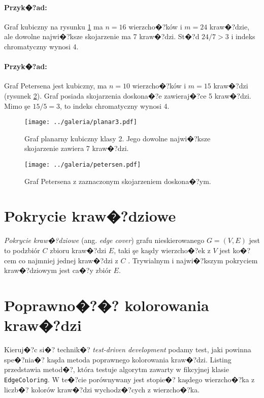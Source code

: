 \documentclass[12pt,a4paper]{mwrep}
\begin{document}
\paragraph{Przyk�?ad:} Graf kubiczny na rysunku \ref{fig:planar3}
ma $n=16$ wierzcho�?ków i $m=24$ kraw�?dzie, 
ale dowolne najwi�?ksze skojarzenie ma 7 kraw�?dzi. 
St�?d $24/7 > 3$ i indeks chromatyczny wynosi 4.

\paragraph{Przyk�?ad:} Graf Petersena jest kubiczny, ma
$n=10$ wierzcho�?ków i $m=15$ kraw�?dzi (rysunek \ref{fig:petersen}).
Graf posiada skojarzenia doskona�?e zawieraj�?ce 5 kraw�?dzi.
Mimo şe $15/5=3$, to indeks chromatyczny wynosi 4.

\begin{figure}[h]
\centering
\texttt{[image: ../galeria/planar3.pdf]}
\caption[Graf planarny kubiczny klasy 2.]{
\label{fig:planar3}
Graf planarny kubiczny klasy 2.
Jego dowolne najwi�?ksze skojarzenie zawiera 7 kraw�?dzi.}
\end{figure}

\begin{figure}[h]
\centering
\texttt{[image: ../galeria/petersen.pdf]}
\caption{
\label{fig:petersen}
Graf Petersena z zaznaczonym skojarzeniem doskona�?ym.}
\end{figure}

\section{Pokrycie kraw�?dziowe}
\label{sec:edge_cover}

\emph{Pokrycie kraw�?dziowe} (ang. \emph{edge cover})
grafu nieskierowanego $G=(V,E)$ jest to podzbiór $C$
zbioru kraw�?dzi $E$, taki şe kaşdy wierzcho�?ek z $V$
jest ko�?cem co najmniej jednej kraw�?dzi z $C$
\cite{wiki_edge_cover}.
Trywialnym i najwi�?kszym pokryciem kraw�?dziowym
jest ca�?y zbiór $E$.

\section{Poprawno�?�? kolorowania kraw�?dzi}
\label{sec:proper_edge_coloring}

Kieruj�?c si�? technik�? \emph{test-driven development}
podamy test, jaki powinna spe�?nia�? kaşda metoda poprawnego
kolorowania kraw�?dzi. Listing przedstawia metod�?, która testuje 
algorytm zawarty w fikcyjnej klasie \lstinline|EdgeColoring|.
W te�?cie porównywany jest stopie�? kaşdego wierzcho�?ka
z liczb�? kolorów kraw�?dzi wychodz�?cych z wierzcho�?ka.
\end{document}
